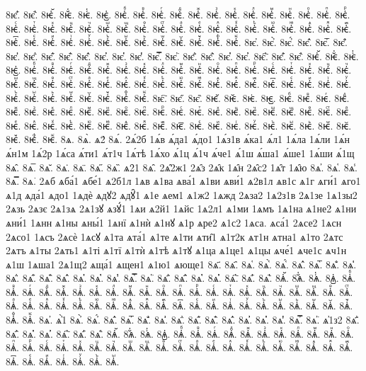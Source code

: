 {8ѥ҅᷀.
8ѥ҅᷁.
8ѥ҅᷶.
8ѥ᷷҅.
8ѥ᷸҅.
8ѥ᷹҅.
8ѥ҅ⷠ.
8ѥ҅ⷡ.
8ѥ҅ⷢ.
8ѥ҅ⷣ.
8ѥ҅ⷤ.
8ѥ҅ⷥ.
8ѥ҅ⷦ.
8ѥ҅ⷧ.
8ѥ҅ⷨ.
8ѥ҅ⷩ.
8ѥ҅ⷪ.
8ѥ҅ⷫ.
8ѥ҅ⷬ.
8ѥ҅ⷭ.
8ѥ҅ⷮ.
8ѥ҅ⷯ.
8ѥ҅ⷰ.
8ѥ҅ⷱ.
8ѥ҅ⷲ.
8ѥ҅ⷳ.
8ѥ҅ⷴ.
8ѥ҅ⷵ.
8ѥ҅ⷶ.
8ѥ҅ⷷ.
8ѥ҅ⷸ.
8ѥ҅ⷹ.
8ѥ҅ⷺ.
8ѥ҅ⷻ.
8ѥ҅ⷼ.
8ѥ҅ⷽ.
8ѥ҅ⷾ.
8ѥ҅ⷿ.
8ѥ҅꙯.
8ѥ҅ꙴ.
8ѥ҅ꙵ.
8ѥ҅ꙶ.
8ѥ҅ꙷ.
8ѥ҅ꙸ.
8ѥ҅ꙹ.
8ѥ҅ꙺ.
8ѥ҅ꙻ.
8ѥ҅꙼.
8ѥ҅꙽.
8ѥ҅ꚞ.
8ѥ҅ꚟ.
8ѥ҆.
8ѥ҆̀.
8ѥ҆́.
8ѥ҆̂.
8ѥ҆̅.
8ѥ҆̆.
8ѥ҆̇.
8ѥ҆̈.
8ѥ҆̋.
8ѥ҆̏.
8ѥ҆̑.
8ѥ҆̓.
8ѥ҆̔.
8ѥ҆̾.
8ѥ҆̿.
8ѥ҆͘.
8ѥ҆҃.
8ѥ҆҄.
8ѥ҆҅.
8ѥ҆҆.
8ѥ҆҇.
8ѥ҆᷀.
8ѥ҆᷁.
8ѥ҆᷶.
8ѥ᷷҆.
8ѥ᷸҆.
8ѥ᷹҆.
8ѥ҆ⷠ.
8ѥ҆ⷡ.
8ѥ҆ⷢ.
8ѥ҆ⷣ.
8ѥ҆ⷤ.
8ѥ҆ⷥ.
8ѥ҆ⷦ.
8ѥ҆ⷧ.
8ѥ҆ⷨ.
8ѥ҆ⷩ.
8ѥ҆ⷪ.
8ѥ҆ⷫ.
8ѥ҆ⷬ.
8ѥ҆ⷭ.
8ѥ҆ⷮ.
8ѥ҆ⷯ.
8ѥ҆ⷰ.
8ѥ҆ⷱ.
8ѥ҆ⷲ.
8ѥ҆ⷳ.
8ѥ҆ⷴ.
8ѥ҆ⷵ.
8ѥ҆ⷶ.
8ѥ҆ⷷ.
8ѥ҆ⷸ.
8ѥ҆ⷹ.
8ѥ҆ⷺ.
8ѥ҆ⷻ.
8ѥ҆ⷼ.
8ѥ҆ⷽ.
8ѥ҆ⷾ.
8ѥ҆ⷿ.
8ѥ҆꙯.
8ѥ҆ꙴ.
8ѥ҆ꙵ.
8ѥ҆ꙶ.
8ѥ҆ꙷ.
8ѥ҆ꙸ.
8ѥ҆ꙹ.
8ѥ҆ꙺ.
8ѥ҆ꙻ.
8ѥ҆꙼.
8ѥ҆꙽.
8ѥ҆ꚞ.
8ѥ҆ꚟ.
8ѥ҇.
8ѥ᷀.
8ѥ᷁.
8ѥ᷶.
8ѥ᷷.
8ѥ᷸.
8ѥ᷹.
8ѥⷠ.
8ѥⷡ.
8ѥⷢ.
8ѥⷣ.
8ѥⷤ.
8ѥⷥ.
8ѥⷦ.
8ѥⷧ.
8ѥⷨ.
8ѥⷩ.
8ѥⷪ.
8ѥⷫ.
8ѥⷬ.
8ѥⷭ.
8ѥⷮ.
8ѥⷯ.
8ѥⷰ.
8ѥⷱ.
8ѥⷲ.
8ѥⷳ.
8ѥⷴ.
8ѥⷵ.
8ѥⷶ.
8ѥⷷ.
8ѥⷸ.
8ѥⷹ.
8ѥⷺ.
8ѥⷻ.
8ѥⷼ.
8ѥⷽ.
8ѥⷾ.
8ѥⷿ.
8ѥ꙯.
8ѥꙴ.
8ѥꙵ.
8ѥꙶ.
8ѥꙷ.
8ѥꙸ.
8ѥꙹ.
8ѥꙺ.
8ѥꙻ.
8ѥ꙼.
8ѥ꙽.
8ѥꚞ.
8ѥꚟ.
8ѧ.
8ѧ̀.
ѧ2́
8ѧ́.
2ѧ́2б
1ѧ́в
ѧ́да1
ѧ́до1
1ѧ́з1в
ѧ́ка1
ѧ́л1
1ѧ́ла
1ѧ́ли
1ѧ́н
ѧ́н1м
1ѧ́2р
1ѧ́са
ѧ́ти1
ѧ́т1ч
1ѧ́тѣ
1ѧ́хо
ѧ́1ц
ѧ́1ч
ѧ́че1
ѧ́1ш
ѧ́ша1
ѧ́ше1
1ѧ́ши
ѧ́1щ
8ѧ̂.
8ѧ̅.
8ѧ̆.
8ѧ̇.
8ѧ̈.
8ѧ̋.
8ѧ̏.
ѧ2̑1
8ѧ̑.
2ѧ̑2ж1
2ѧ̑з
2ѧ̑к
1ѧ̑н
2ѧ̑с2
1ѧ̑т
1ѧ̑ю
8ѧ̓.
8ѧ̔.
8ѧ̾.
8ѧ̿.
8ѧ͘.
2ѧб
ѧба́1
ѧбе́1
ѧ2б1л
1ѧв
ѧ1ва
ѧва́1
ѧ1ви
ѧви́1
ѧ2в1л
ѧв1с
ѧ1г
ѧги́1
ѧго1
ѧ1д
ѧда́1
ѧдо1
1ѧдѐ
ѧдꙋ2
ѧдꙋ̑1
ѧ1е
ѧем1
ѧ1ж2
1ѧжд
2ѧза2
1ѧ2з1в
2ѧ1зе
1ѧ1зы2
2ѧзь
2ѧзє
2ѧ1зѧ
2ѧ1зꙋ
ѧзꙋ́1
1ѧи
ѧ2й1
1ѧйс
1ѧ2л1
ѧ1ми
1ѧмъ
1ѧ1на
ѧ1не2
ѧ1ни
ѧни́1
1ѧнн
ѧ1ны
ѧны́1
1ѧнї
ѧ1нѝ
ѧ1нꙋ
ѧ1р
ѧре2
ѧ1с2
1ѧса.
ѧса́1
2ѧсе2
1ѧсн
2ѧсо1
1ѧсъ
2ѧсѐ
1ѧсꙋ
ѧ1та
ѧта́1
ѧ1те
ѧ1ти
ѧти̑1
ѧ1т2к
ѧт1н
ѧтна1
ѧ1то
2ѧтс
2ѧтъ
ѧ1ты
2ѧть1
ѧ1ті
ѧ1тї
ѧ1тѝ
ѧ1тѣ
ѧ1тꙋ
ѧ1ца
ѧ1це1
ѧ1цы
ѧче́1
ѧче1с
ѧч1н
ѧ1ш
1ѧша1
2ѧ1щ2
ѧща́1
ѧщен1
ѧ1ю1
ѧюще1
8ѧ҃.
8ѧ҄.
8ѧ҅.
8ѧ҅̀.
8ѧ҅́.
8ѧ҅̂.
8ѧ҅̅.
8ѧ҅̆.
8ѧ҅̇.
8ѧ҅̈.
8ѧ҅̋.
8ѧ҅̏.
8ѧ҅̑.
8ѧ҅̓.
8ѧ҅̔.
8ѧ҅̾.
8ѧ҅̿.
8ѧ҅͘.
8ѧ҅҃.
8ѧ҅҄.
8ѧ҅҅.
8ѧ҅҆.
8ѧ҅҇.
8ѧ҅᷀.
8ѧ҅᷁.
8ѧ҅᷶.
8ѧ᷷҅.
8ѧ᷸҅.
8ѧ᷹҅.
8ѧ҅ⷠ.
8ѧ҅ⷡ.
8ѧ҅ⷢ.
8ѧ҅ⷣ.
8ѧ҅ⷤ.
8ѧ҅ⷥ.
8ѧ҅ⷦ.
8ѧ҅ⷧ.
8ѧ҅ⷨ.
8ѧ҅ⷩ.
8ѧ҅ⷪ.
8ѧ҅ⷫ.
8ѧ҅ⷬ.
8ѧ҅ⷭ.
8ѧ҅ⷮ.
8ѧ҅ⷯ.
8ѧ҅ⷰ.
8ѧ҅ⷱ.
8ѧ҅ⷲ.
8ѧ҅ⷳ.
8ѧ҅ⷴ.
8ѧ҅ⷵ.
8ѧ҅ⷶ.
8ѧ҅ⷷ.
8ѧ҅ⷸ.
8ѧ҅ⷹ.
8ѧ҅ⷺ.
8ѧ҅ⷻ.
8ѧ҅ⷼ.
8ѧ҅ⷽ.
8ѧ҅ⷾ.
8ѧ҅ⷿ.
8ѧ҅꙯.
8ѧ҅ꙴ.
8ѧ҅ꙵ.
8ѧ҅ꙶ.
8ѧ҅ꙷ.
8ѧ҅ꙸ.
8ѧ҅ꙹ.
8ѧ҅ꙺ.
8ѧ҅ꙻ.
8ѧ҅꙼.
8ѧ҅꙽.
8ѧ҅ꚞ.
8ѧ҅ꚟ.
8ѧ҆.
ѧ҆̀1
8ѧ҆̀.
8ѧ҆́.
8ѧ҆̂.
8ѧ҆̅.
8ѧ҆̆.
8ѧ҆̇.
8ѧ҆̈.
8ѧ҆̋.
8ѧ҆̏.
8ѧ҆̑.
8ѧ҆̓.
8ѧ҆̔.
8ѧ҆̾.
8ѧ҆̿.
8ѧ҆͘.
ѧ҆1з2
8ѧ҆҃.
8ѧ҆҄.
8ѧ҆҅.
8ѧ҆҆.
8ѧ҆҇.
8ѧ҆᷀.
8ѧ҆᷁.
8ѧ҆᷶.
8ѧ᷷҆.
8ѧ᷸҆.
8ѧ᷹҆.
8ѧ҆ⷠ.
8ѧ҆ⷡ.
8ѧ҆ⷢ.
8ѧ҆ⷣ.
8ѧ҆ⷤ.
8ѧ҆ⷥ.
8ѧ҆ⷦ.
8ѧ҆ⷧ.
8ѧ҆ⷨ.
8ѧ҆ⷩ.
8ѧ҆ⷪ.
8ѧ҆ⷫ.
8ѧ҆ⷬ.
8ѧ҆ⷭ.
8ѧ҆ⷮ.
8ѧ҆ⷯ.
8ѧ҆ⷰ.
8ѧ҆ⷱ.
8ѧ҆ⷲ.
8ѧ҆ⷳ.
8ѧ҆ⷴ.
8ѧ҆ⷵ.
8ѧ҆ⷶ.
8ѧ҆ⷷ.
8ѧ҆ⷸ.
8ѧ҆ⷹ.
8ѧ҆ⷺ.
8ѧ҆ⷻ.
8ѧ҆ⷼ.
8ѧ҆ⷽ.
8ѧ҆ⷾ.
8ѧ҆ⷿ.
8ѧ҆꙯.
8ѧ҆ꙴ.
8ѧ҆ꙵ.
8ѧ҆ꙶ.
8ѧ҆ꙷ.
8ѧ҆ꙸ.
8ѧ҆ꙹ.
}
